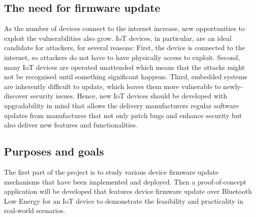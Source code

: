 \subsection{The need for firmware update}
\justify
As the number of devices connect to the internet increase, new opportunities 
to exploit the vulnerabilities also grow. IoT devices, in particular, are 
an ideal candidate for attackers, for several reasons: First, the device 
is connected to the internet, so attackers do not have to have physically 
access to exploit. Second, many IoT devices are operated unattended which 
means that the attacks might not be recognised until something significant 
happens. Third, embedded systems are inherently difficult to update, which 
leaves them more vulnerable to newly-discover security issues.  Hence, 
new IoT devices should be developed with upgradability in mind that allows 
the delivery manufacturers regular software updates from manufactures that 
not only patch bugs and enhance security but also deliver new features 
and functionalities.

\subsection{Purposes and goals}
\justify
The first part of the project is to study various device firmware update 
mechanisms that have been implemented and deployed. Then a proof-of-concept 
application will be developed that features device firmware update over 
Bluetooth Low Energy for an IoT device to demonstrate the feasibility and 
practicality in real-world scenarios.  